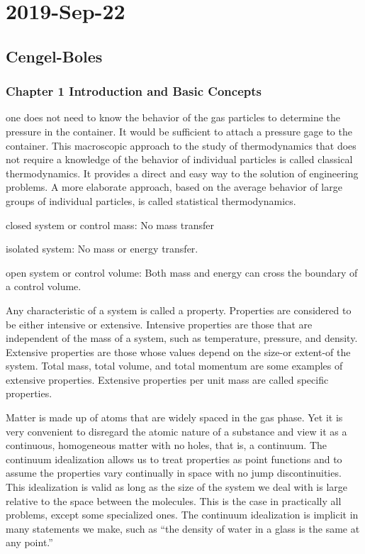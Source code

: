 \chapter{2019-Sep-22}

\section{Cengel-Boles}

\subsection{Chapter 1 Introduction and Basic Concepts}

\begin{ennumerate}
\item	one does not need to know the behavior of the gas particles to determine the pressure in the container. It would be sufficient to attach a pressure gage to the container. This macroscopic approach to the study of thermodynamics that does not require a knowledge of the behavior of individual particles is called classical thermodynamics. It provides a direct and easy way to the solution of engineering problems. A more elaborate approach, based on the average behavior of large groups of individual particles, is called statistical thermodynamics.

\item	closed system or control mass: No mass transfer

isolated system: No mass or energy transfer.

open system or control volume: Both mass and energy can cross the boundary of a control volume.

\item	Any characteristic of a system is called a property. Properties are considered to be either intensive or extensive. Intensive properties are those that are independent of the mass of a system, such as temperature, pressure, and density. Extensive properties are those whose values depend on the size-or extent-of the system. Total mass, total volume, and total momentum are some examples of extensive properties. Extensive properties per unit mass are called specific properties.

\item	Matter is made up of atoms that are widely spaced in the gas phase. Yet it is very convenient to disregard the atomic nature of a substance and view it as a continuous, homogeneous matter with no holes, that is, a continuum. The continuum idealization allows us to treat properties as point functions
and to assume the properties vary continually in space with no jump discontinuities. This idealization is valid as long as the size of the system we deal with is large relative to the space between the molecules. This is the case in practically all problems, except some specialized ones. The continuum
idealization is implicit in many statements we make, such as “the density of water in a glass is the same at any point.”


\end{ennumerate}
